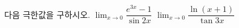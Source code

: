 다음 극한값을 구하시오.
 $\displaystyle\lim_{x\to 0}\dfrac{e^{3x}-1}{\sin 2x}$
 $\displaystyle\lim_{x\to 0}\dfrac{\ln(x+1)}{\tan 3x}$
